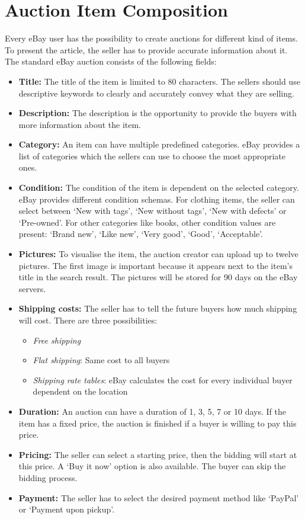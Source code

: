 \section{Auction Item Composition}
Every eBay user has the possibility to create auctions for different kind of items. To present the article, the seller has to provide accurate information about it. The standard eBay auction consists of the following fields:
\begin{itemize}
	\item \textbf{Title:} The title of the item is limited to 80 characters. The sellers should use descriptive keywords to clearly and accurately convey what they are selling.
	\item \textbf{Description:} The description is the opportunity to provide the buyers with more information about the item.
	\item \textbf{Category:} An item can have multiple predefined categories. eBay provides a list of categories which the sellers can use to choose the most appropriate ones.
	\item \textbf{Condition:} The condition of the item is dependent on the selected category. eBay provides different condition schemas. For clothing items, the seller can select between `New with tags', `New without tags', `New with defects' or `Pre-owned'. For other categories like books, other condition values are present: `Brand new', `Like new', `Very good', `Good', `Acceptable'.
	\item \textbf{Pictures:} To visualise the item, the auction creator can upload up to twelve pictures. The first image is important because it appears next to the item's title in the search result. The pictures will be stored for 90 days on the eBay servers.
	\item \textbf{Shipping costs:} The seller has to tell the future buyers how much shipping will cost. There are three possibilities:
	\begin{itemize}
		\item \textit{Free shipping}
		\item \textit{Flat shipping}: Same cost to all buyers
		\item \textit{Shipping rate tables}: eBay calculates the cost for every individual buyer dependent on the location
	\end{itemize}
	\item \textbf{Duration:} An auction can have a duration of 1, 3, 5, 7 or 10 days. If the item has a fixed price, the auction is finished if a buyer is willing to pay this price.
	\item \textbf{Pricing:} The seller can select a starting price, then the bidding will start at this price. A `Buy it now' option is also available. The buyer can skip the bidding process.
	\item \textbf{Payment:} The seller has to select the desired payment method like `PayPal' or `Payment upon pickup'.
\end{itemize}

